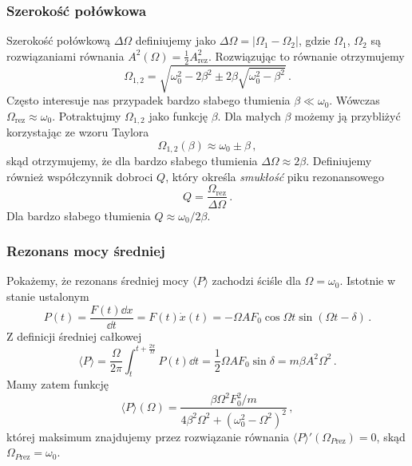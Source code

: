 \documentclass[../main.tex]{subfiles}
\begin{document}
    \subsubsection*{Szerokość połówkowa}
    Szerokość połówkową \(\Delta\Omega\) definiujemy jako \(\Delta\Omega=|\Omega_1-\Omega_2|\),
    gdzie \(\Omega_1\), \(\Omega_2\) są rozwiązaniami równania
    \(A^2(\Omega)=\frac{1}{2}A^2_{\text{rez}}\). Rozwiązując to równanie otrzymujemy
    \begin{equation*}
        \Omega_{1,2}=\sqrt{\omega_0^2-2\beta^2\pm2\beta\sqrt{\omega_0^2-\beta^2}}\,.
    \end{equation*}
    Często interesuje nas przypadek bardzo słabego tłumienia \(\beta\ll\omega_0\). Wówczas
    \(\Omega_\text{rez}\approx \omega_0\). Potraktujmy \(\Omega_{1,2}\) jako funkcję \(\beta\). Dla
    małych \(\beta\) możemy ją przybliżyć korzystając ze wzoru Taylora
    \begin{equation*}
        \Omega_{1,2}(\beta)\approx\omega_0\pm\beta\,,
    \end{equation*}
    skąd otrzymujemy, że dla bardzo słabego tłumienia \(\Delta \Omega\approx 2\beta\). Definiujemy
    również współczynnik dobroci \(Q\), który określa \textit{smukłość} piku rezonansowego
    \begin{equation*}
        Q=\frac{\Omega_\text{rez}}{\Delta\Omega}\,.
    \end{equation*}
    Dla bardzo słabego tłumienia \(Q\approx \omega_0/2\beta\).
    \subsubsection*{Rezonans mocy średniej}
    Pokażemy, że rezonans średniej mocy \(\langle P\rangle\) zachodzi ściśle dla
    \(\Omega=\omega_0\). Istotnie w stanie ustalonym
    \begin{equation*}
        P(t)=\frac{F(t)\dd{x}}{\dd{t}}=F(t)\dot x(t)=-\Omega AF_0\cos\Omega t\sin(\Omega t-\delta)\,.
    \end{equation*}
    Z definicji średniej całkowej 
    \begin{equation*}
        \langle P\rangle=\frac{\Omega}{2\pi}\int_t^{t+\frac{2\pi}{\Omega}}P(t)\dd{t}=\frac{1}{2}\Omega AF_0\sin\delta=m\beta A^2\Omega^2\,.
    \end{equation*}
    Mamy zatem funkcję
    \begin{equation*}
        \langle P\rangle (\Omega)=\frac{\beta\Omega^2F_0^2/m}{4\beta^2\Omega^2+(\omega_0^2-\Omega^2)^2}
\,,    \end{equation*}
której maksimum znajdujemy przez rozwiązanie równania \(\langle P\rangle'
(\Omega_{P\text{rez}})=0\), skąd \(\Omega_{P\text{rez}}=\omega_0\).
\end{document}
